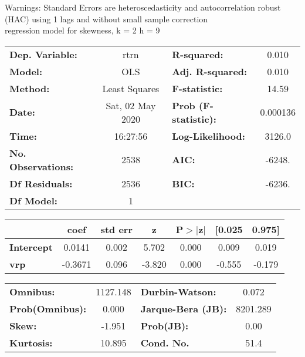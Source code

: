Warnings: \newline
 [1] Standard Errors are heteroscedasticity and autocorrelation robust (HAC) using 1 lags and without small sample correction\\ 

regression model for skewness, k = 2 h = 9\begin{center}
\begin{tabular}{lclc}
\toprule
\textbf{Dep. Variable:}    &       rtrn       & \textbf{  R-squared:         } &     0.010   \\
\textbf{Model:}            &       OLS        & \textbf{  Adj. R-squared:    } &     0.010   \\
\textbf{Method:}           &  Least Squares   & \textbf{  F-statistic:       } &     14.59   \\
\textbf{Date:}             & Sat, 02 May 2020 & \textbf{  Prob (F-statistic):} &  0.000136   \\
\textbf{Time:}             &     16:27:56     & \textbf{  Log-Likelihood:    } &    3126.0   \\
\textbf{No. Observations:} &        2538      & \textbf{  AIC:               } &    -6248.   \\
\textbf{Df Residuals:}     &        2536      & \textbf{  BIC:               } &    -6236.   \\
\textbf{Df Model:}         &           1      & \textbf{                     } &             \\
\bottomrule
\end{tabular}
\begin{tabular}{lcccccc}
                   & \textbf{coef} & \textbf{std err} & \textbf{z} & \textbf{P$> |$z$|$} & \textbf{[0.025} & \textbf{0.975]}  \\
\midrule
\textbf{Intercept} &       0.0141  &        0.002     &     5.702  &         0.000        &        0.009    &        0.019     \\
\textbf{vrp}       &      -0.3671  &        0.096     &    -3.820  &         0.000        &       -0.555    &       -0.179     \\
\bottomrule
\end{tabular}
\begin{tabular}{lclc}
\textbf{Omnibus:}       & 1127.148 & \textbf{  Durbin-Watson:     } &    0.072  \\
\textbf{Prob(Omnibus):} &   0.000  & \textbf{  Jarque-Bera (JB):  } & 8201.289  \\
\textbf{Skew:}          &  -1.951  & \textbf{  Prob(JB):          } &     0.00  \\
\textbf{Kurtosis:}      &  10.895  & \textbf{  Cond. No.          } &     51.4  \\
\bottomrule
\end{tabular}
\end{center}

